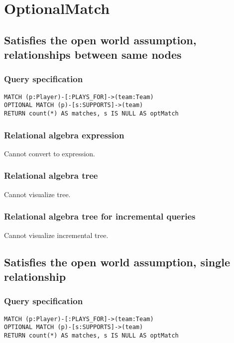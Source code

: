 \section{OptionalMatch}

\subsection{Satisfies the open world assumption, relationships between same nodes}

\subsubsection*{Query specification}

\begin{lstlisting}
MATCH (p:Player)-[:PLAYS_FOR]->(team:Team)
OPTIONAL MATCH (p)-[s:SUPPORTS]->(team)
RETURN count(*) AS matches, s IS NULL AS optMatch
\end{lstlisting}

\subsubsection*{Relational algebra expression}

Cannot convert to expression.

\subsubsection*{Relational algebra tree}

Cannot visualize tree.

\subsubsection*{Relational algebra tree for incremental queries}

Cannot visualize incremental tree.

\subsection{Satisfies the open world assumption, single relationship}

\subsubsection*{Query specification}

\begin{lstlisting}
MATCH (p:Player)-[:PLAYS_FOR]->(team:Team)
OPTIONAL MATCH (p)-[s:SUPPORTS]->(team)
RETURN count(*) AS matches, s IS NULL AS optMatch
\end{lstlisting}

